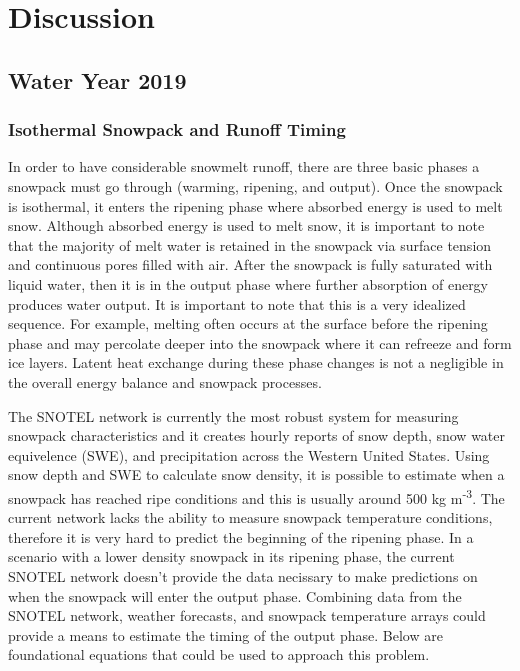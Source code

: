 \chapter{Discussion}
\section{Water Year 2019} 
\subsection{Isothermal Snowpack and Runoff Timing}
In order to have considerable snowmelt runoff, there are three basic phases a snowpack must go through (warming, ripening, and output). Once the snowpack is isothermal, it enters the ripening phase where absorbed energy is used to melt snow. Although absorbed energy is used to melt snow, it is important to note that the majority of melt water is retained in the snowpack via surface tension and continuous pores filled with air. After the snowpack is fully saturated with liquid water, then it is in the output phase where further absorption of energy produces water output. It is important to note that this is a very idealized sequence. For example, melting often occurs at the surface before the ripening phase and may percolate deeper into the snowpack where it can refreeze and form ice layers. Latent heat exchange during these phase changes is not a negligible in the overall energy balance and snowpack processes. 

The SNOTEL network is currently the most robust system for measuring snowpack characteristics and it creates hourly reports of snow depth, snow water equivelence (SWE), and precipitation across the Western United States. Using snow depth and SWE to calculate snow density, it is possible to estimate when a snowpack has reached ripe conditions and this is usually around 500 kg m\textsuperscript{-3}. The current network lacks the ability to measure snowpack temperature conditions, therefore it is very hard to predict the beginning of the ripening phase. In a scenario with a lower density snowpack in its ripening phase, the current SNOTEL network doesn't provide the data necissary to make predictions on when the snowpack will enter the output phase. Combining data from the SNOTEL network, weather forecasts, and snowpack temperature arrays could provide a means to estimate the timing of the output phase. Below are foundational equations that could be used to approach this problem. 

